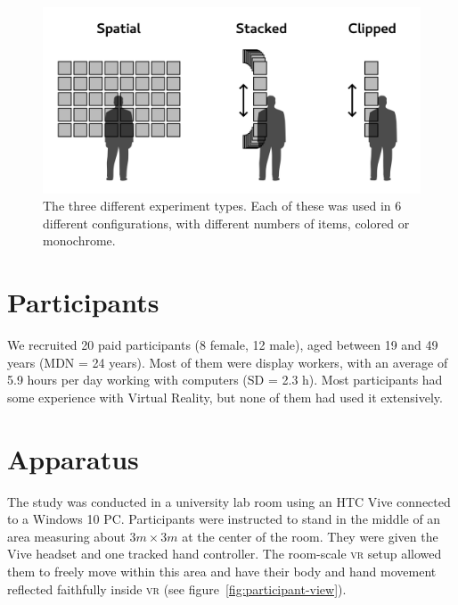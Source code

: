 \documentclass[nobib]{tufte-book} %
\begin{document}
\begin{figure}
  \includegraphics{types.png}
  \caption{The three different experiment types. Each of these was used in 6 different configurations, with different numbers of items, colored or monochrome.}
  \label{fig:experiment-types}
\end{figure}

\section{Participants}
We recruited 20 paid participants (8 female, 12 male), aged between 19 and 49 years (MDN = 24 years). Most of them were display workers, with an average of 5.9 hours per day working with computers (SD = 2.3 h). Most participants had some experience with Virtual Reality, but none of them had used it extensively.

\section{Apparatus}
The study was conducted in a university lab room using an HTC Vive connected to a Windows 10 PC. Participants were instructed to stand in the middle of an area measuring about $3m \times 3m$ at the center of the room. They were given the Vive headset and one tracked hand controller. The room-scale \textsc{vr} setup allowed them to freely move within this area and have their body and hand movement reflected faithfully inside \textsc{vr} (see figure~\ref{fig:participant-view}).
\end{document}
